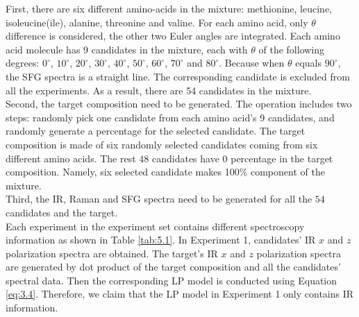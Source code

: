 First, there are six different amino-acids in the mixture: methionine, leucine, isoleucine(ile), alanine, threonine and valine. For each amino acid, only $\theta$ difference is considered, the other two Euler angles are integrated. Each amino acid molecule has 9 candidates in the mixture, each with $\theta$ of the following degrees: $0^{\circ}$,  $10^{\circ}$, $20^{\circ}$, $30^{\circ}$, $40^{\circ}$, $50^{\circ}$, $60^{\circ}$, $70^{\circ}$ and $80^{\circ}$. Because when $\theta$ equals $90^{\circ}$, the SFG spectra is a straight line. The corresponding candidate is excluded from all the experiments. As a result, there are 54 candidates in the mixture. \\

Second, the target composition need to be generated. The operation includes two steps: randomly pick one candidate from each amino acid's 9 candidates, and randomly generate a percentage for the selected candidate. The target composition is made of six randomly selected candidates coming from six different amino acids. The rest $48$ candidates have $0$ percentage in the target composition. Namely, six selected candidate makes 100\% component of the mixture. \\

Third, the IR, Raman and SFG spectra need to be generated for all the $54$ candidates and the target. \\



Each experiment in the experiment set contains different spectroscopy information as shown in Table \ref{tab:5.1}. In Experiment 1, candidates' IR $x$ and $z$ polarization spectra are obtained. The target's IR $x$ and $z$ polarization spectra are generated by dot product of the target composition and all the candidates' spectral data. Then the corresponding LP model is conducted using Equation \ref{eq:3.4}. Therefore, we claim that the LP model in Experiment 1 only contains IR information.\\


